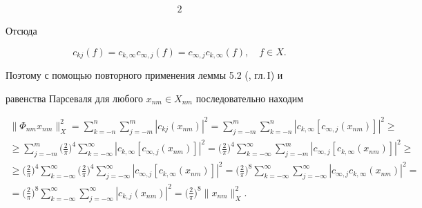 \begin{pf}
\begin{alignat*}{2}
\end{alignat*} 


Отсюда 


\begin{equation} 


c_{k j}(f)=c_{k,\infty}c_{\infty,j}(f)= 


c_{\infty,j}c_{k,\infty}(f),\quad f\in X. 


\end{equation} 


Поэтому с помощью повторного применения леммы 5.2 (\cite{4}, гл.\,I) и 


равенства Парсеваля для любого $x_{nm}\in X_{nm}$ последовательно находим 


\begin{multline} 


\|\Phi_{nm}x_{nm}\|^2_X=\sum^n_{k=-n}\sum^m_{j=-m} 


|c_{k j}(x_{nm})|^2=\sum^m_{j=-m}\sum^n_{k=-n} 


|c_{k,\infty}[c_{\infty,j}(x_{nm})]|^2\ge \\ 


% 


\ge\sum^m_{j=-m}\bigg(\frac{2}{\pi} \bigg)^4\sum^\infty_{k=-\infty} 


|c_{k,\infty}[c_{\infty,j}(x_{nm})]|^2=\bigg(\frac{2}{\pi} \bigg)^4 


\sum^\infty_{k=-\infty}\sum^m_{j=-m} 


|c_{\infty,j}[c_{k,\infty}(x_{nm})]|^2\ge \\ 


% 


\ge\bigg(\frac{2}{\pi} \bigg)^4\sum^\infty_{k=-\infty} 


\bigg(\frac{2}{\pi} \bigg)^4\sum^\infty_{j=-\infty} 


|c_{\infty,j}[c_{k,\infty}(x_{nm})]|^2= 


\bigg(\frac{2}{\pi} \bigg)^8\sum^\infty_{k=-\infty} 


\sum^\infty_{j=-\infty}|c_{\infty,j}c_{k,\infty}(x_{nm})|^2= \\ 


% 


=\bigg(\frac{2}{\pi} \bigg)^8\sum^\infty_{k=-\infty} 


\sum^\infty_{j=-\infty}|c_{k,j}(x_{nm})|^2= 


\bigg(\frac{2}{\pi} \bigg)^8\|x_{nm}\|^2_X. 


\end{multline} 



\end{pf}
